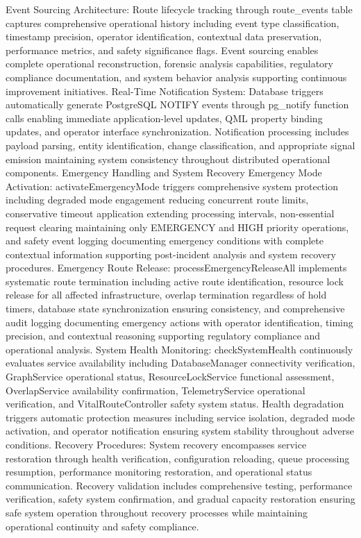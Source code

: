 Event Sourcing Architecture: Route lifecycle tracking through route_events table captures comprehensive operational history including event type classification, timestamp precision, operator identification, contextual data preservation, performance metrics, and safety significance flags. Event sourcing enables complete operational reconstruction, forensic analysis capabilities, regulatory compliance documentation, and system behavior analysis supporting continuous improvement initiatives.
Real-Time Notification System: Database triggers automatically generate PostgreSQL NOTIFY events through pg_notify function calls enabling immediate application-level updates, QML property binding updates, and operator interface synchronization. Notification processing includes payload parsing, entity identification, change classification, and appropriate signal emission maintaining system consistency throughout distributed operational components.
Emergency Handling and System Recovery
Emergency Mode Activation: activateEmergencyMode triggers comprehensive system protection including degraded mode engagement reducing concurrent route limits, conservative timeout application extending processing intervals, non-essential request clearing maintaining only EMERGENCY and HIGH priority operations, and safety event logging documenting emergency conditions with complete contextual information supporting post-incident analysis and system recovery procedures.
Emergency Route Release: processEmergencyReleaseAll implements systematic route termination including active route identification, resource lock release for all affected infrastructure, overlap termination regardless of hold timers, database state synchronization ensuring consistency, and comprehensive audit logging documenting emergency actions with operator identification, timing precision, and contextual reasoning supporting regulatory compliance and operational analysis.
System Health Monitoring: checkSystemHealth continuously evaluates service availability including DatabaseManager connectivity verification, GraphService operational status, ResourceLockService functional assessment, OverlapService availability confirmation, TelemetryService operational verification, and VitalRouteController safety system status. Health degradation triggers automatic protection measures including service isolation, degraded mode activation, and operator notification ensuring system stability throughout adverse conditions.
Recovery Procedures: System recovery encompasses service restoration through health verification, configuration reloading, queue processing resumption, performance monitoring restoration, and operational status communication. Recovery validation includes comprehensive testing, performance verification, safety system confirmation, and gradual capacity restoration ensuring safe system operation throughout recovery processes while maintaining operational continuity and safety compliance.